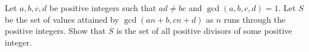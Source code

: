 Let $a,b,c,d$ be positive integers such that $ad \neq bc$ and $\gcd(a,b,c,d)=1$. Let $S$ be the set of values attained by $\gcd(an+b,cn+d)$ as $n$ runs through the positive integers. Show that $S$ is the set of all positive divisors of some positive integer.
